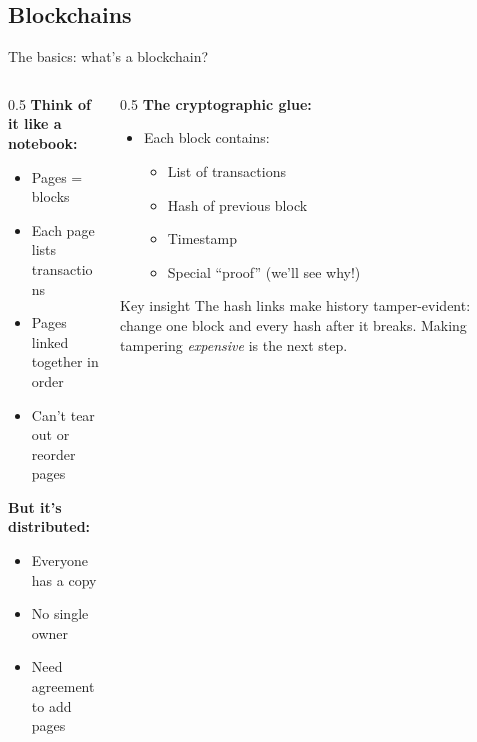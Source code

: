 \ifdefined\PRESENTATION\else\PassOptionsToClass{handout}{beamer}\fi\documentclass[aspectratio=169, lualatex]{beamer}
\begin{document}
\subsection{Blockchains}

\begin{frame}{The basics: what's a blockchain?}
	\begin{columns}[c]
		\begin{column}{0.5\textwidth}
			\textbf{Think of it like a notebook:}
			\begin{itemize}
				\item Pages = blocks
				\item Each page lists transactions
				\item Pages linked together in order
				\item Can't tear out or reorder pages
			\end{itemize}
			\textbf{But it's distributed:}
			\begin{itemize}
				\item Everyone has a copy
				\item No single owner
				\item Need agreement to add pages
			\end{itemize}
		\end{column}
		\begin{column}{0.5\textwidth}
			\textbf{The cryptographic glue:}
			\begin{itemize}
				\item Each block contains:
				      \begin{itemize}
					      \item List of transactions
					      \item Hash of previous block
					      \item Timestamp
					      \item Special ``proof'' (we'll see why!)
				      \end{itemize}
			\end{itemize}
			\begin{alertblock}{Key insight}
				The hash links make history tamper-evident: change one block and every hash after it breaks. Making tampering \emph{expensive} is the next step.
			\end{alertblock}
		\end{column}
	\end{columns}
\end{frame}
\end{document}
